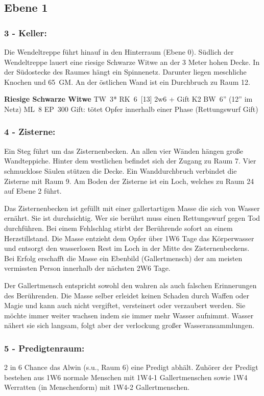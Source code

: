 \subsection{Ebene 1}

\subsubsection{3 - Keller:} Die Wendeltreppe führt hinauf in den Hinterraum
(Ebene 0). Südlich der Wendeltreppe lauert eine riesige Schwarze Witwe an der 3
Meter hohen Decke.  In der Südostecke des Raumes hängt ein Spinnenetz. Darunter
liegen meschliche Knochen und 65~GM. An der östlichen Wand ist ein Durchbruch
zu Raum 12.

\textbf{Riesige Schwarze Witwe} TW~3* RK~6~[13] 2w6 + Gift K2 BW~6'' (12''
im Netz) ML~8 EP~300 
Gift: tötet Opfer innerhalb einer Phase (Rettungswurf Gift)

\subsubsection{4 - Zisterne:} Ein Steg führt um das Zisternenbecken. An allen
vier Wänden hängen große Wandteppiche. Hinter dem westlichen befindet sich der
Zugang zu Raum 7. Vier schmucklose Säulen stützen die Decke. Ein Wanddurchbruch
verbindet die Zisterne mit Raum 9. Am Boden der Zisterne ist ein
Loch, welches zu Raum 24 auf Ebene 2 führt.


Das Zisternenbecken ist gefüllt mit einer gallertartigen Masse die sich von
Wasser ernährt. Sie ist durchsichtig. Wer sie berührt muss einen Rettungswurf
gegen Tod durchführen. Bei einem Fehlschlag stirbt der Berührende sofort an
einem Herzstillstand. Die Masse entzieht dem Opfer über 1W6 Tage das
Körperwasser und entsorgt den wasserlosen Rest im Loch in der Mitte des
Zisternenbeckens. Bei Erfolg erschafft die Masse ein Ebenbild (Gallertmensch)
der am meisten vermissten Person innerhalb der nächsten 2W6 Tage.

Der Gallertmensch entspricht sowohl den wahren als auch falschen Erinnerungen
des Berührenden.  Die Masse selber erleidet keinen Schaden durch Waffen oder
Magie und kann auch nicht vergiftet, versteinert oder verzaubert werden. Sie
möchte immer weiter wachsen indem sie immer mehr Wasser aufnimmt. Wasser nähert
sie sich langsam, folgt aber der verlockung großer Wasseransammlungen.

\subsubsection{5 - Predigtenraum:} 2 in 6 Chance das Alwin (s.u., Raum 6) eine
Predigt abhält. Zuhörer der Predigt bestehen aus 1W6 normale Menschen mit 1W4-1
Gallertmenschen sowie 1W4 Werratten (in Menschenform) mit 1W4-2
Gallertmenschen.

